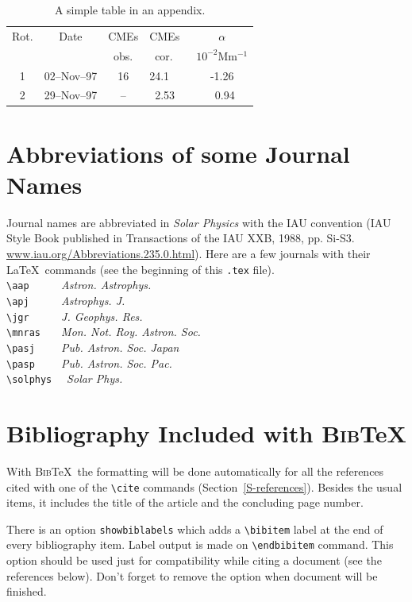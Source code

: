 \documentclass[namedreferences]{solarphysics}
\newcommand{\BibTeX}{\textsc{Bib}\TeX}
\newcommand{\aap}{    {\it Astron. Astrophys.}}
\newcommand{\apj}{    {\it Astrophys. J.}}
\newcommand{\jgr}{    {\it J. Geophys. Res.}}
\newcommand{\mnras}{  {\it Mon. Not. Roy. Astron. Soc.}}
\newcommand{\pasp}{   {\it Pub. Astron. Soc. Pac.}}
\newcommand{\pasj}{   {\it Pub. Astron. Soc. Japan}}
\newcommand{\solphys}{{\it Solar Phys.}}
\begin{document}
\begin{article}
  \begin{table}
   \caption{ A simple table in an appendix. }
   \label{T-appendix}
    \begin{tabular}{ccclc}     %
      \hline                   %
    Rot. & Date & CMEs & CMEs~ & $\alpha$ \\
         &      & obs. & ~cor. & $10^{-2}$Mm$^{-1}$\\
      \hline
    1 & 02--Nov--97 & 16  & 24.1  & -1.26 \\
    2 & 29--Nov--97 & --  & ~2.53 & ~0.94 \\
      \hline
    \end{tabular}
   \end{table}


\section{Abbreviations of some Journal Names} %
    \label{S-appendix}
Journal names are abbreviated in {\it Solar Physics} with the IAU
convention (IAU Style Book
published in Transactions of the IAU XXB, 1988, pp. Si-S3.
\url{www.iau.org/Abbreviations.235.0.html}).  Here are a few journals with their \LaTeX\ 
commands (see the beginning of this \texttt{.tex} file).\\
  \verb+\aap     + \aap \\
  \verb+\apj     + \apj \\
  \verb+\jgr     + \jgr \\
  \verb+\mnras   + \mnras \\
  \verb+\pasj    + \pasj \\
  \verb+\pasp    + \pasp \\
  \verb+\solphys +~ \solphys 
  
\section*{Bibliography Included with \BibTeX } 
  With \BibTeX\ the formatting will be done automatically for all 
the references cited with one
of the \verb+\cite+ commands (Section~\ref{S-references}).
Besides the usual items, it includes the title of the article 
and the concluding page number. 
   
There is an option \texttt{showbiblabels} which adds a \verb+\bibitem+ 
label at the end of every bibliography item. Label output is made on \verb+\endbibitem+ command.
This option should be used 
just for compatibility while citing a document (see the references below). 
Don't forget to remove the option when document will be finished.


\end{article}
\end{document}
